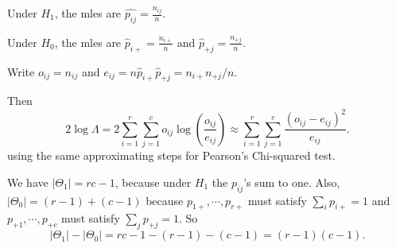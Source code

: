 \documentclass[a4paper]{article}
\begin{document}
Under $H_1$, the mles are $\hat{p_{ij}} = \frac{n_{ij}}{n}$.

Under $H_0$, the mles are $\hat{p}_{i+} = \frac{n_{i+}}{n}$ and $\hat{p}_{+j} = \frac{n_{+j}}{n}$.

Write $o_{ij} = n_{ij}$ and $e_{ij} = n\hat{p}_{i+}\hat{p}_{+j} = n_{i+}n_{+j}/n$.

Then
\[
  2\log \Lambda = 2\sum_{i = 1}^r \sum_{j = 1}^c o_{ij}\log\left(\frac{o_{ij}}{e_{ij}}\right) \approx \sum_{i = 1}^r \sum_{j = 1}^c \frac{(o_{ij} - e_{ij})^2}{e_{ij}}.
\]
using the same approximating steps for Pearson's Chi-squared test.

We have $|\Theta_1| = rc - 1$, because under $H_1$ the $p_{ij}$'s sum to one. Also, $|\Theta_0| = (r - 1) + (c - 1)$ because $p_{1+}, \cdots, p_{r+}$ must satisfy $\sum_i p_{i+} = 1$ and $p_{+1}, \cdots, p_{+c}$ must satisfy $\sum_j p_{+j} = 1$. So
\[
  |\Theta_1| - |\Theta_0| = rc - 1 - (r - 1) - (c - 1) = (r - 1)(c - 1).
\]
\end{document}
